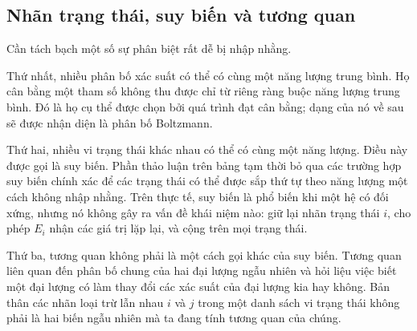 \begin{classroomqa}
\end{classroomqa}

\begin{classroomqa}
\end{classroomqa}

\subsection{Nhãn trạng thái, suy biến và tương quan}

Cần tách bạch một số sự phân biệt rất dễ bị nhập nhằng.

Thứ nhất, nhiều phân bố xác suất có thể có cùng một năng lượng trung bình. Họ cân bằng một tham số không thu được chỉ từ riêng ràng buộc năng lượng trung bình. Đó là họ cụ thể được chọn bởi quá trình đạt cân bằng; dạng của nó về sau sẽ được nhận diện là phân bố Boltzmann.

Thứ hai, nhiều vi trạng thái khác nhau có thể có cùng một năng lượng. Điều này được gọi là suy biến. Phần thảo luận trên bảng tạm thời bỏ qua các trường hợp suy biến chính xác để các trạng thái có thể được sắp thứ tự theo năng lượng một cách không nhập nhằng. Trên thực tế, suy biến là phổ biến khi một hệ có đối xứng, nhưng nó không gây ra vấn đề khái niệm nào: giữ lại nhãn trạng thái \(i\), cho phép \(E_i\) nhận các giá trị lặp lại, và cộng trên mọi trạng thái.

Thứ ba, tương quan không phải là một cách gọi khác của suy biến. Tương quan liên quan đến phân bố chung của hai đại lượng ngẫu nhiên và hỏi liệu việc biết một đại lượng có làm thay đổi các xác suất của đại lượng kia hay không. Bản thân các nhãn loại trừ lẫn nhau \(i\) và \(j\) trong một danh sách vi trạng thái không phải là hai biến ngẫu nhiên mà ta đang tính tương quan của chúng.


